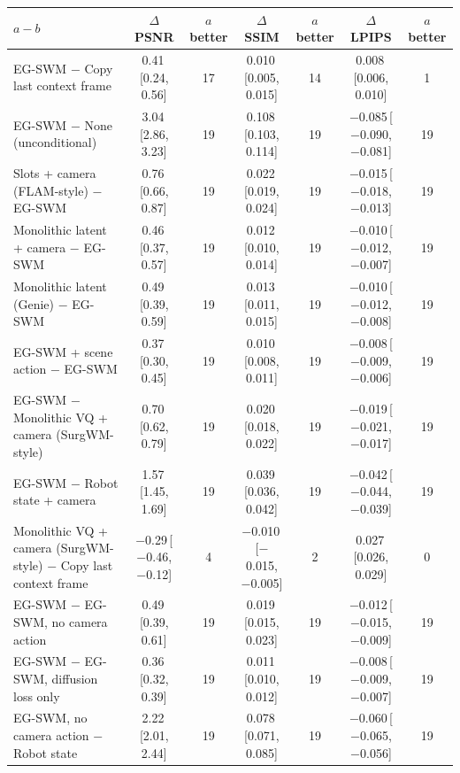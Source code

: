 \begin{tabular}{lcccccc}
\toprule
$a - b$ & $\Delta$PSNR & $a$ better & $\Delta$SSIM & $a$ better & $\Delta$LPIPS & $a$ better \\
\midrule
EG-SWM $-$ Copy last context frame & 0.41\,{\scriptsize[0.24, 0.56]} & 17 & 0.010\,{\scriptsize[0.005, 0.015]} & 14 & 0.008\,{\scriptsize[0.006, 0.010]} & 1 \\
EG-SWM $-$ None (unconditional) & 3.04\,{\scriptsize[2.86, 3.23]} & 19 & 0.108\,{\scriptsize[0.103, 0.114]} & 19 & $-$0.085\,{\scriptsize[$-$0.090, $-$0.081]} & 19 \\
Slots + camera (FLAM-style) $-$ EG-SWM & 0.76\,{\scriptsize[0.66, 0.87]} & 19 & 0.022\,{\scriptsize[0.019, 0.024]} & 19 & $-$0.015\,{\scriptsize[$-$0.018, $-$0.013]} & 19 \\
Monolithic latent + camera $-$ EG-SWM & 0.46\,{\scriptsize[0.37, 0.57]} & 19 & 0.012\,{\scriptsize[0.010, 0.014]} & 19 & $-$0.010\,{\scriptsize[$-$0.012, $-$0.007]} & 19 \\
Monolithic latent (Genie) $-$ EG-SWM & 0.49\,{\scriptsize[0.39, 0.59]} & 19 & 0.013\,{\scriptsize[0.011, 0.015]} & 19 & $-$0.010\,{\scriptsize[$-$0.012, $-$0.008]} & 19 \\
EG-SWM + scene action $-$ EG-SWM & 0.37\,{\scriptsize[0.30, 0.45]} & 19 & 0.010\,{\scriptsize[0.008, 0.011]} & 19 & $-$0.008\,{\scriptsize[$-$0.009, $-$0.006]} & 19 \\
EG-SWM $-$ Monolithic VQ + camera (SurgWM-style) & 0.70\,{\scriptsize[0.62, 0.79]} & 19 & 0.020\,{\scriptsize[0.018, 0.022]} & 19 & $-$0.019\,{\scriptsize[$-$0.021, $-$0.017]} & 19 \\
EG-SWM $-$ Robot state + camera & 1.57\,{\scriptsize[1.45, 1.69]} & 19 & 0.039\,{\scriptsize[0.036, 0.042]} & 19 & $-$0.042\,{\scriptsize[$-$0.044, $-$0.039]} & 19 \\
Monolithic VQ + camera (SurgWM-style) $-$ Copy last context frame & $-$0.29\,{\scriptsize[$-$0.46, $-$0.12]} & 4 & $-$0.010\,{\scriptsize[$-$0.015, $-$0.005]} & 2 & 0.027\,{\scriptsize[0.026, 0.029]} & 0 \\
EG-SWM $-$ EG-SWM, no camera action & 0.49\,{\scriptsize[0.39, 0.61]} & 19 & 0.019\,{\scriptsize[0.015, 0.023]} & 19 & $-$0.012\,{\scriptsize[$-$0.015, $-$0.009]} & 19 \\
EG-SWM $-$ EG-SWM, diffusion loss only & 0.36\,{\scriptsize[0.32, 0.39]} & 19 & 0.011\,{\scriptsize[0.010, 0.012]} & 19 & $-$0.008\,{\scriptsize[$-$0.009, $-$0.007]} & 19 \\
EG-SWM, no camera action $-$ Robot state & 2.22\,{\scriptsize[2.01, 2.44]} & 19 & 0.078\,{\scriptsize[0.071, 0.085]} & 19 & $-$0.060\,{\scriptsize[$-$0.065, $-$0.056]} & 19 \\

\end{tabular}
